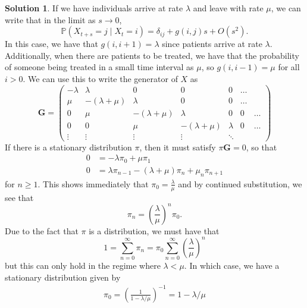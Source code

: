 \documentclass[12pt]{article}
\newcommand{\Prob}{\mathbb{P}}
\let\vec\mathbf
\theoremstyle{definition}
\newtheorem{sol}{Solution}
\theoremstyle{remark}
\begin{document}
\begin{sol}
    If we have individuals arrive at rate $\lambda$ and leave with rate $\mu$, we can write that in the limit as $s\to 0$,
    \begin{equation*}
        \Prob( X_{t+s} = j \mid X_{t} = i ) = \delta_{ij} + g(i,j)s + O(s^{2}).
        \end{equation*}
In this case, we have that $g(i,i+1) = \lambda$ since patients arrive at rate $\lambda$. Additionally, when there are patients to be treated, we have that the probability of someone being treated in a small time interval as $\mu$, so $g(i, i-1) = \mu$ for all $i > 0$. We can use this to write the generator of $X$ as
 \begin{equation*}
\vec{G} 
=
\begin{pmatrix}
    -\lambda & \lambda & 0 & 0 & 0 & \ldots\\
    \mu      & -(\lambda + \mu) & \lambda & 0 & 0 & \ldots\\
    0        &\mu               & -(\lambda + \mu) & \lambda & 0 & 0 & \ldots\\
    0        & 0        &\mu               & -(\lambda + \mu) & \lambda & 0 &  \ldots\\
    \vdots & \vdots             & \vdots            & \vdots & \ddots
\end{pmatrix}
\end{equation*}
If there is a stationary distribution $\pi$, then it must satisfy $\pi \vec{G} = 0$, so that
\begin{align*}
    0 &= -\lambda \pi_{0} + \mu \pi_{1}\\
    0 &= \lambda \pi_{n-1} - (\lambda + \mu)\pi_{n} + \mu_{n} \pi_{n+1}
\end{align*}
for $n\geq 1$. This shows immediately that $\pi_{0} = \frac{\lambda}{\mu}$ and by continued substitution, we see that 
\begin{equation*}
    \pi_{n} = \left(\frac{\lambda}{\mu}\right)^{n} \pi_{0}.
\end{equation*}
Due to the fact that $\pi$ is a distribution, we must have that
\begin{equation*}
    1 = \sum_{n=0}^{\infty } \pi_{n} =  \pi_{0} \sum_{n=0}^{\infty }\left(\frac{\lambda}{\mu}\right)^{n} 
\end{equation*}
but this can only hold in the regime where $\lambda < \mu$. In which case, we have a stationary distribution given by
\begin{align*}
    \pi_{0} = \left(\frac{1}{1- \lambda / \mu}\right)^{-1} = 1 - \lambda / \mu\\

\end{align*}
\end{sol}
\end{document}
